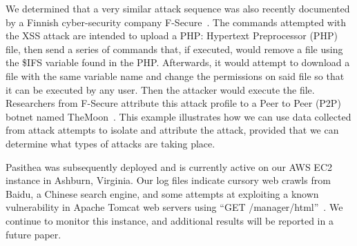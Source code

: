 We determined that a very similar attack sequence was also recently documented by a Finnish cyber-security company F-Secure~\cite{F-Secure}. 
The commands attempted with the XSS attack are intended to upload a PHP: Hypertext Preprocessor (PHP) file, then send a series of commands that, if executed, would remove a file using the \$IFS variable found in the PHP. 
Afterwards, it would attempt to download a file with the same variable name and change the permissions on said file so that it can be executed by any user.  
Then the attacker would execute the file. 
Researchers from F-Secure  attribute this attack profile to a Peer to Peer (P2P) botnet named TheMoon~\cite{TheMoon}. 
This example illustrates how we can use data collected from attack attempts to isolate and attribute the attack, provided that we can determine what types of attacks are taking place.

Pasithea was subsequently deployed and is currently active on our AWS EC2 instance in Ashburn, Virginia. 
Our log files indicate cursory web crawls from Baidu, a Chinese search engine, and some attempts at exploiting a known vulnerability in Apache Tomcat web servers using ``GET /manager/html''~\cite{Tomcat-Exploit}. 
We continue to monitor this instance, and additional results will be reported in a future paper.
